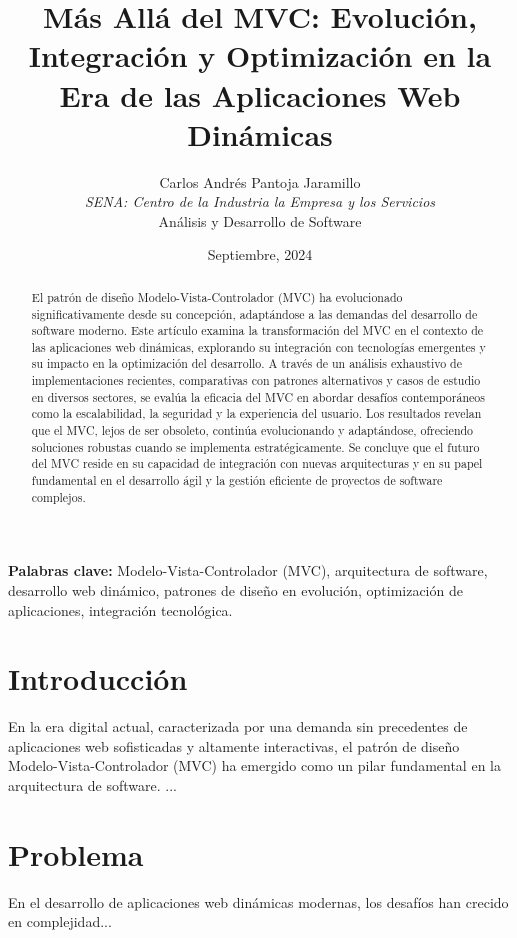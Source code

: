 \documentclass[12pt]{article}
\title{Más Allá del MVC: Evolución, Integración y Optimización en la Era de las Aplicaciones Web Dinámicas}
\author{Carlos Andrés Pantoja Jaramillo \\ \textit{SENA: Centro de la Industria la Empresa y los Servicios} \\ Análisis y Desarrollo de Software}
\date{Septiembre, 2024}
\begin{document}
\maketitle

\begin{abstract}
El patrón de diseño Modelo-Vista-Controlador (MVC) ha evolucionado significativamente desde su concepción, adaptándose a las demandas del desarrollo de software moderno. Este artículo examina la transformación del MVC en el contexto de las aplicaciones web dinámicas, explorando su integración con tecnologías emergentes y su impacto en la optimización del desarrollo. A través de un análisis exhaustivo de implementaciones recientes, comparativas con patrones alternativos y casos de estudio en diversos sectores, se evalúa la eficacia del MVC en abordar desafíos contemporáneos como la escalabilidad, la seguridad y la experiencia del usuario. Los resultados revelan que el MVC, lejos de ser obsoleto, continúa evolucionando y adaptándose, ofreciendo soluciones robustas cuando se implementa estratégicamente. Se concluye que el futuro del MVC reside en su capacidad de integración con nuevas arquitecturas y en su papel fundamental en el desarrollo ágil y la gestión eficiente de proyectos de software complejos.
\end{abstract}

\textbf{Palabras clave:} Modelo-Vista-Controlador (MVC), arquitectura de software, desarrollo web dinámico, patrones de diseño en evolución, optimización de aplicaciones, integración tecnológica.

\section{Introducción}
En la era digital actual, caracterizada por una demanda sin precedentes de aplicaciones web sofisticadas y altamente interactivas, el patrón de diseño Modelo-Vista-Controlador (MVC) ha emergido como un pilar fundamental en la arquitectura de software. ...


\section{Problema}
En el desarrollo de aplicaciones web dinámicas modernas, los desafíos han crecido en complejidad...

\end{document}
